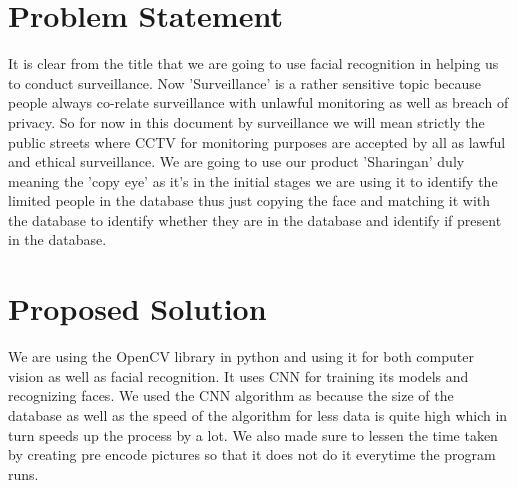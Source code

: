 \documentclass[14.49pt, a4paper, one side, margin = 2in]{article}
\begin{document}
\section{Problem Statement}
\par It is clear from the title that we are going to use facial recognition in helping us to conduct surveillance. Now 'Surveillance' is a rather sensitive topic because people always co-relate surveillance with unlawful monitoring as well as breach of privacy. So for now in this document by surveillance we will mean strictly the public streets where CCTV for monitoring purposes are accepted by all as lawful and ethical surveillance. We are going to use our product  'Sharingan' duly meaning the 'copy eye' as it's in the initial stages we are using it to identify the limited people in the database thus just copying the face and matching it with the database to identify whether they are in the database and identify if present in the database.
\clearpage
\section{Proposed Solution}
We are using the OpenCV library in python and using it for both computer vision as well as facial recognition. It uses CNN for training its models and recognizing faces. We used the CNN algorithm as because the size of the database as well as the speed of the algorithm for less data is quite high which in turn speeds up the process by a lot. We also made sure to lessen the time taken by creating pre encode pictures so that it does not do it everytime the program runs. 
\par 
\clearpage
\end{document}
